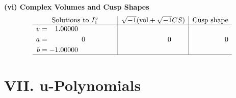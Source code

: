\documentclass[1p]{elsarticle_modified}
\theoremstyle{definition}
\newcommand{\I}{\sqrt{-1}}
\begin{document}
\newpage\flushleft \textbf{(vi) Complex Volumes and Cusp Shapes}
$$\begin{array}{c|c|c}  
\text{Solutions to }I^v_{1}& \I (\text{vol} + \sqrt{-1}CS) & \text{Cusp shape}\\
 \hline 
\begin{aligned}
v &= \phantom{-}1.00000\phantom{ +0.000000I} \\
a &= \phantom{-0.000000 } 0 \\
b &= -1.00000\phantom{ +0.000000I}\end{aligned}
 & \phantom{-0.000000 } 0 & \phantom{-0.000000 } 0\\
 \hline 
 \end{array}$$\newpage
\newpage\renewcommand{\arraystretch}{1}
\centering \section*{ VII. u-Polynomials}
\end{document}
